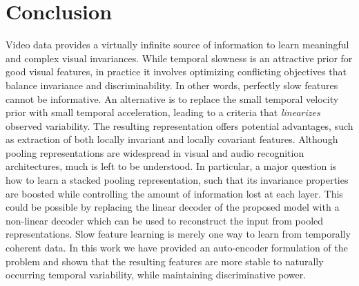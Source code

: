 \section{Conclusion} Video data provides a virtually infinite source of
information to learn meaningful and complex visual invariances. While temporal
slowness is an attractive prior for good visual features, in practice it
involves optimizing conflicting objectives that balance invariance and
discriminability. In other words, perfectly slow features cannot be
informative. An alternative is to replace the small temporal velocity prior
with small temporal acceleration, leading to a criteria that \emph{linearizes}
observed variability. The resulting representation offers potential advantages,
such as extraction of both locally invariant and locally covariant features.
Although pooling representations are widespread in visual and audio recognition
architectures, much is left to be understood. In particular, a major question
is how to learn a stacked pooling representation, such that its invariance
properties are boosted while controlling the amount of information lost at each
layer. This could be possible by replacing the linear decoder of the proposed
model with a non-linear decoder which can be used to reconstruct the input from
pooled representations. Slow feature learning is merely one way to learn from
temporally coherent data. In this work we have provided an auto-encoder
formulation of the problem and shown that the resulting features are more
stable to naturally occurring temporal variability, while maintaining
discriminative power.
